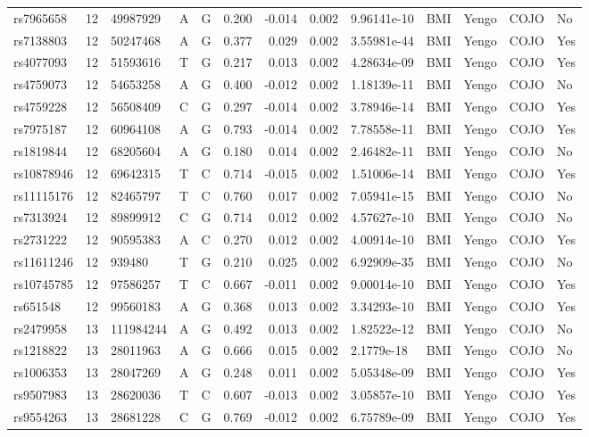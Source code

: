 \documentclass[11pt,twoside]{bristolthesis}
\begin{document}
\begin{longtable}[t]{lrlllrrrlllll}
rs7965658 & 12 & 49987929 & A & G & 0.200 & -0.014 & 0.002 & 9.96141e-10 & BMI & Yengo & COJO & No\\
rs7138803 & 12 & 50247468 & A & G & 0.377 & 0.029 & 0.002 & 3.55981e-44 & BMI & Yengo & COJO & Yes\\
\addlinespace
rs4077093 & 12 & 51593616 & T & G & 0.217 & 0.013 & 0.002 & 4.28634e-09 & BMI & Yengo & COJO & Yes\\
rs4759073 & 12 & 54653258 & A & G & 0.400 & -0.012 & 0.002 & 1.18139e-11 & BMI & Yengo & COJO & No\\
rs4759228 & 12 & 56508409 & C & G & 0.297 & -0.014 & 0.002 & 3.78946e-14 & BMI & Yengo & COJO & Yes\\
rs7975187 & 12 & 60964108 & A & G & 0.793 & -0.014 & 0.002 & 7.78558e-11 & BMI & Yengo & COJO & Yes\\
rs1819844 & 12 & 68205604 & A & G & 0.180 & 0.014 & 0.002 & 2.46482e-11 & BMI & Yengo & COJO & No\\
\addlinespace
rs10878946 & 12 & 69642315 & T & C & 0.714 & -0.015 & 0.002 & 1.51006e-14 & BMI & Yengo & COJO & Yes\\
rs11115176 & 12 & 82465797 & T & C & 0.760 & 0.017 & 0.002 & 7.05941e-15 & BMI & Yengo & COJO & No\\
rs7313924 & 12 & 89899912 & C & G & 0.714 & 0.012 & 0.002 & 4.57627e-10 & BMI & Yengo & COJO & No\\
rs2731222 & 12 & 90595383 & A & C & 0.270 & 0.012 & 0.002 & 4.00914e-10 & BMI & Yengo & COJO & Yes\\
rs11611246 & 12 & 939480 & T & G & 0.210 & 0.025 & 0.002 & 6.92909e-35 & BMI & Yengo & COJO & No\\
\addlinespace
rs10745785 & 12 & 97586257 & T & C & 0.667 & -0.011 & 0.002 & 9.00014e-10 & BMI & Yengo & COJO & Yes\\
rs651548 & 12 & 99560183 & A & G & 0.368 & 0.013 & 0.002 & 3.34293e-10 & BMI & Yengo & COJO & Yes\\
rs2479958 & 13 & 111984244 & A & G & 0.492 & 0.013 & 0.002 & 1.82522e-12 & BMI & Yengo & COJO & No\\
rs1218822 & 13 & 28011963 & A & G & 0.666 & 0.015 & 0.002 & 2.1779e-18 & BMI & Yengo & COJO & No\\
rs1006353 & 13 & 28047269 & A & G & 0.248 & 0.011 & 0.002 & 5.05348e-09 & BMI & Yengo & COJO & Yes\\
\addlinespace
rs9507983 & 13 & 28620036 & T & C & 0.607 & -0.013 & 0.002 & 3.05857e-10 & BMI & Yengo & COJO & Yes\\
rs9554263 & 13 & 28681228 & C & G & 0.769 & -0.012 & 0.002 & 6.75789e-09 & BMI & Yengo & COJO & Yes\\

\end{longtable}
\end{document}
